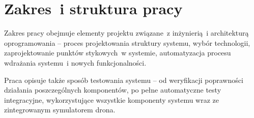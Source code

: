 \section{Zakres~i struktura pracy} \label{intro_scope}

Zakres pracy obejmuje elementy projektu związane~z inżynierią~i architekturą oprogramowania -- proces projektowania struktury systemu,
wybór technologii, zaprojektowanie punktów stykowych~w systemie, automatyzacja
procesu wdrażania systemu~i nowych funkcjonalności.

Praca opisuje także sposób testowania systemu -- od weryfikacji poprawności działania
poszczególnych komponentów, po pełne automatyczne testy integracyjne, wykorzystujące 
wszystkie komponenty systemu wraz ze zintegrowanym symulatorem drona. 
